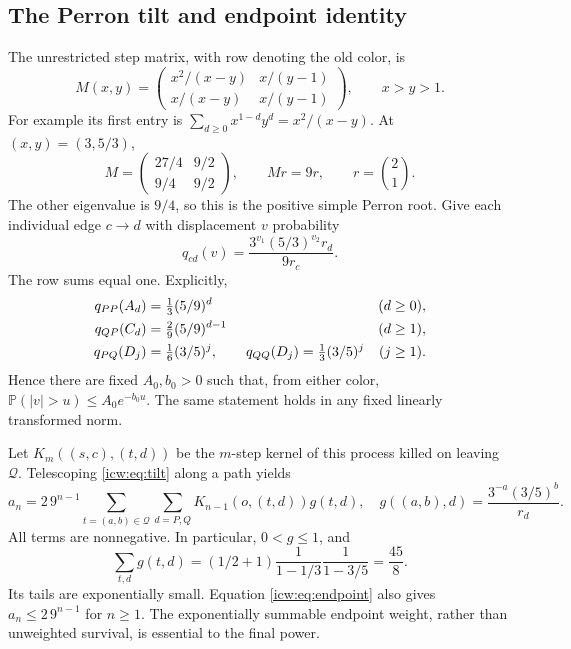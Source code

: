 \documentclass[11pt,letterpaper]{article}
\theoremstyle{remark}\newtheorem{remark}[theorem]{Remark}
\newcommand{\Prob}{\mathbb P}
\newcommand{\Qd}{\mathcal Q}
\newcommand{\1}{\mathbf1}
\begin{document}
\subsection{The Perron tilt and endpoint identity}\label{icw:sub:tilt}
The unrestricted step matrix, with row denoting the old color, is
\begin{equation}\label{icw:eq:M}
 M(x,y)=\begin{pmatrix}x^2/(x-y)&x/(y-1)\\x/(x-y)&x/(y-1)\end{pmatrix},
 \qquad x>y>1.
\end{equation}
For example its first entry is
$\sum_{d\ge0}x^{1-d}y^d=x^2/(x-y)$. At $(x,y)=(3,5/3)$,
\[
 M=\begin{pmatrix}27/4&9/2\\9/4&9/2\end{pmatrix},\qquad
 Mr=9r,\qquad r=\binom21.
\]
The other eigenvalue is $9/4$, so this is the positive simple Perron
root. Give each individual edge $c\to d$ with displacement $v$ probability
\begin{equation}\label{icw:eq:tilt}
 q_{cd}(v)=\frac{3^{v_1}(5/3)^{v_2}r_d}{9r_c}.
\end{equation}
The row sums equal one. Explicitly,
\begin{align}
 q_{PP}(A_d)&=\tfrac13(5/9)^d &(d&\ge0),\notag\\
 q_{QP}(C_d)&=\tfrac29(5/9)^{d-1}&(d&\ge1),\label{icw:eq:q}\\
 q_{PQ}(D_j)&=\tfrac16(3/5)^j,\qquad
 q_{QQ}(D_j)=\tfrac13(3/5)^j &(j&\ge1).\notag
\end{align}
Hence there are fixed $A_0,b_0>0$ such that, from either color,
$\Prob(|v|>u)\le A_0e^{-b_0u}$. The same statement holds in any fixed
linearly transformed norm.

Let $K_m((s,c),(t,d))$ be the $m$-step kernel of this process killed
on leaving $\Qd$. Telescoping \eqref{icw:eq:tilt} along a path yields
\begin{equation}\label{icw:eq:endpoint}
 a_n=2\,9^{n-1}\sum_{t=(a,b)\in\Qd}\sum_{d=P,Q}
       K_{n-1}(o,(t,d))g(t,d),\quad
 g((a,b),d)=\frac{3^{-a}(3/5)^b}{r_d}.
\end{equation}
All terms are nonnegative. In particular, $0<g\le1$, and
\begin{equation}\label{icw:eq:gsum}
 \sum_{t,d}g(t,d)=
 (1/2+1)\frac1{1-1/3}\frac1{1-3/5}=\frac{45}{8}.
\end{equation}
Its tails are exponentially small. Equation \eqref{icw:eq:endpoint} also gives
$a_n\le2\,9^{n-1}$ for $n\ge1$. The exponentially summable endpoint
weight, rather than unweighted survival, is essential to the final power.
\end{document}
